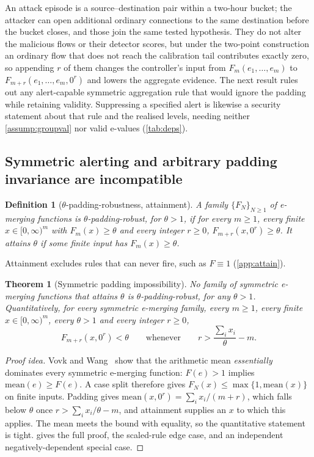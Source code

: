 \documentclass[conference]{IEEEtran}
\newtheorem{theorem}{Theorem}
\newtheorem{definition}{Definition}
\begin{document}
An attack episode is a source--destination pair within a two-hour bucket; the attacker can open
additional ordinary connections to the same destination before the bucket closes, and those join the
same tested hypothesis. They do not alter the malicious flows or their detector scores, but under
the two-point construction an ordinary flow that does not reach the calibration tail contributes exactly
zero, so appending $r$ of them changes the controller's input from $F_m(e_1,\ldots,e_m)$ to
$F_{m+r}(e_1,\ldots,e_m,0^{r})$ and lowers the aggregate evidence. The next result rules out any
alert-capable symmetric aggregation rule that would ignore the padding while retaining validity.
Suppressing a specified alert is likewise a security statement about that rule and the realised
levels, needing neither \cref{assump:groupval} nor valid e-values (\cref{tab:deps}).

\subsection{Symmetric alerting and arbitrary padding invariance are incompatible}\label{sec:impossibility}


\begin{definition}[$\theta$-padding-robustness, attainment]\label{def:padding}
A family $\{F_N\}_{N\ge1}$ of e-merging functions is $\theta$-padding-robust, for $\theta>1$, if for every
$m\ge1$, every finite $x\in[0,\infty)^m$ with $F_m(x)\ge\theta$ and every integer $r\ge0$,
$F_{m+r}(x,0^{r})\ge\theta$. It
\emph{attains} $\theta$ if some finite input has $F_m(x)\ge\theta$.
\end{definition}

Attainment excludes rules that can never fire, such as $F\equiv1$ (\cref{app:attain}).

\begin{theorem}[Symmetric padding impossibility]\label{thm:padding}
No family of symmetric e-merging functions that attains $\theta$ is $\theta$-padding-robust, for any
$\theta>1$. Quantitatively, for every symmetric e-merging family, every $m\ge1$, every finite
$x\in[0,\infty)^m$, every $\theta>1$ and every integer $r\ge0$,
\[
F_{m+r}(x,0^{r})<\theta\qquad\text{whenever}\qquad r>\frac{\sum_i x_i}{\theta}-m .
\]
\end{theorem}

\begin{proof}[Proof idea]
Vovk and Wang~\cite[Prop.~3.1]{vovk2021evalues} show that the arithmetic mean \emph{essentially}
dominates every symmetric e-merging function: $F(e)>1$ implies $\mathrm{mean}(e)\ge F(e)$. A case split therefore gives
$F_N(x)\le\max\{1,\mathrm{mean}(x)\}$ on finite inputs. Padding gives
$\mathrm{mean}(x,0^{r})=\sum_ix_i/(m+r)$, which falls below $\theta$ once $r>\sum_ix_i/\theta-m$, and
attainment supplies an $x$ to which this applies. The mean meets the bound with equality, so the
quantitative statement is tight.  gives the full proof, the scaled-rule edge case, and
an independent negatively-dependent special case.
\end{proof}
\end{document}
